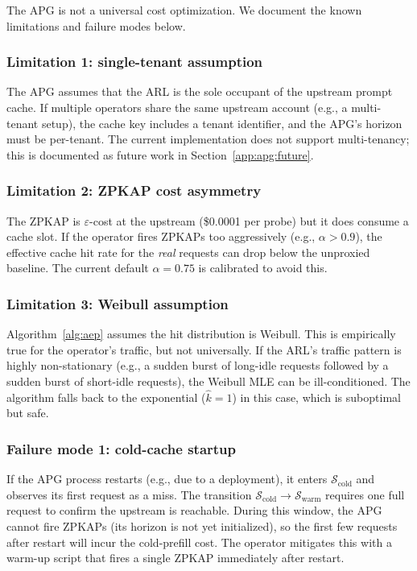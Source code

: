 The APG is not a universal cost optimization. We document the
known limitations and failure modes below.

\subsubsection{Limitation 1: single-tenant assumption}

The APG assumes that the ARL is the sole occupant of the
upstream prompt cache. If multiple operators share the same
upstream account (e.g., a multi-tenant setup), the cache key
includes a tenant identifier, and the APG's horizon must be
per-tenant. The current implementation does not support
multi-tenancy; this is documented as future work in
Section~\ref{app:apg:future}.

\subsubsection{Limitation 2: ZPKAP cost asymmetry}

The ZPKAP is $\varepsilon$-cost at the upstream (\$0.0001 per
probe) but it does consume a cache slot. If the operator
fires ZPKAPs too aggressively (e.g., $\alpha > 0.9$), the
effective cache hit rate for the \emph{real} requests can
drop below the unproxied baseline. The current default
$\alpha = 0.75$ is calibrated to avoid this.

\subsubsection{Limitation 3: Weibull assumption}

Algorithm~\ref{alg:aep} assumes the hit distribution is
Weibull. This is empirically true for the operator's traffic,
but not universally. If the ARL's traffic pattern is highly
non-stationary (e.g., a sudden burst of long-idle requests
followed by a sudden burst of short-idle requests), the
Weibull MLE can be ill-conditioned. The algorithm falls back
to the exponential ($\hat{k} = 1$) in this case, which is
suboptimal but safe.

\subsubsection{Failure mode 1: cold-cache startup}

If the APG process restarts (e.g., due to a deployment), it
enters $\mathcal{S}_{\text{cold}}$ and observes its first
request as a miss. The transition
$\mathcal{S}_{\text{cold}} \to \mathcal{S}_{\text{warm}}$
requires one full request to confirm the upstream is
reachable. During this window, the APG cannot fire ZPKAPs
(its horizon is not yet initialized), so the first few
requests after restart will incur the cold-prefill cost. The
operator mitigates this with a warm-up script that fires a
single ZPKAP immediately after restart.

